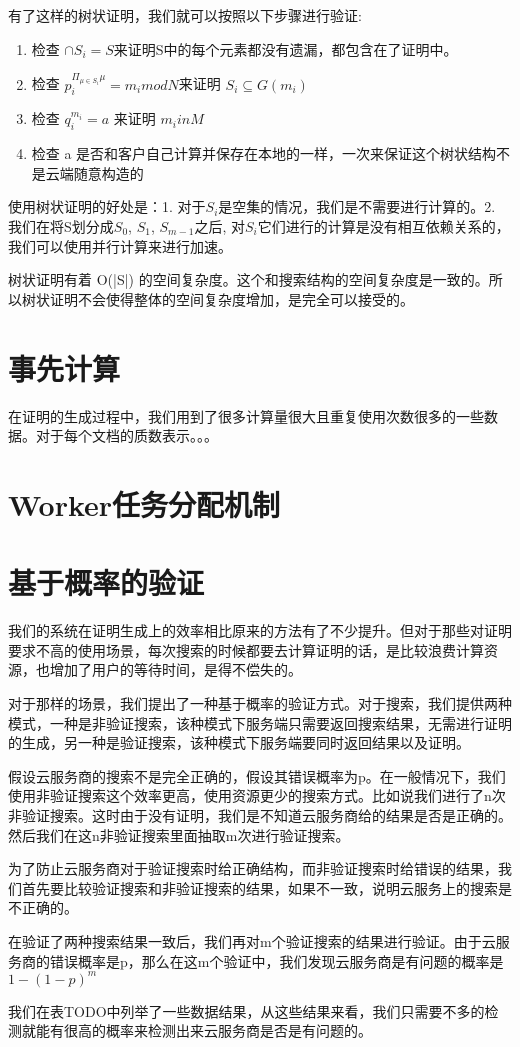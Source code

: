 有了这样的树状证明，我们就可以按照以下步骤进行验证:
\begin{enumerate}
  \item 检查 $\cap S_i = S$来证明S中的每个元素都没有遗漏，都包含在了证明中。
  \item 检查 $p_i^{\Pi_{\mu \in S_i} \mu} = m_i mod N$来证明 $S_i \subseteq G(m_i)$
  \item 检查 $q_i^{m_i} = a$ 来证明 $m_i in M$
  \item 检查 a 是否和客户自己计算并保存在本地的一样，一次来保证这个树状结构不是云端随意构造的
\end{enumerate}

使用树状证明的好处是：1. 对于$S_i$是空集的情况，我们是不需要进行计算的。2. 我们在将S划分成$S_0$, $S_1$, $S_{m-1}$之后, 对$S_i$它们进行的计算是没有相互依赖关系的，我们可以使用并行计算来进行加速。

树状证明有着 O(|S|) 的空间复杂度。这个和搜索结构的空间复杂度是一致的。所以树状证明不会使得整体的空间复杂度增加，是完全可以接受的。

\section{事先计算}
在证明的生成过程中，我们用到了很多计算量很大且重复使用次数很多的一些数据。对于每个文档的质数表示。。。
\section{Worker任务分配机制}
\section{基于概率的验证}
我们的系统在证明生成上的效率相比原来的方法有了不少提升。但对于那些对证明要求不高的使用场景，每次搜索的时候都要去计算证明的话，是比较浪费计算资源，也增加了用户的等待时间，是得不偿失的。

对于那样的场景，我们提出了一种基于概率的验证方式。对于搜索，我们提供两种模式，一种是非验证搜索，该种模式下服务端只需要返回搜索结果，无需进行证明的生成，另一种是验证搜索，该种模式下服务端要同时返回结果以及证明。

假设云服务商的搜索不是完全正确的，假设其错误概率为p。在一般情况下，我们使用非验证搜索这个效率更高，使用资源更少的搜索方式。比如说我们进行了n次非验证搜索。这时由于没有证明，我们是不知道云服务商给的结果是否是正确的。然后我们在这n非验证搜索里面抽取m次进行验证搜索。

为了防止云服务商对于验证搜索时给正确结构，而非验证搜索时给错误的结果，我们首先要比较验证搜索和非验证搜索的结果，如果不一致，说明云服务上的搜索是不正确的。

在验证了两种搜索结果一致后，我们再对m个验证搜索的结果进行验证。由于云服务商的错误概率是p，那么在这m个验证中，我们发现云服务商是有问题的概率是$1-(1-p)^m$

我们在表TODO中列举了一些数据结果，从这些结果来看，我们只需要不多的检测就能有很高的概率来检测出来云服务商是否是有问题的。
